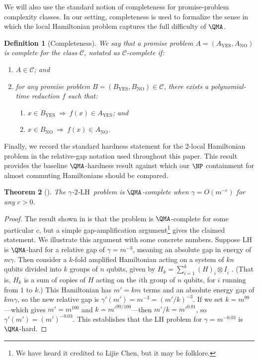 \documentclass[a4paper,onecolumn,11pt]{quantumarticle}
\theoremstyle{plain}
\newtheorem{theorem}{Theorem}[section]
\newtheorem{definition}[theorem]{Definition}
\newcommand{\kLH}{$\gamma$-$2$-$\mathrm{LH}$}
\begin{document}
We will also use the standard notion of completeness for promise-problem complexity classes.  In our setting, completeness is used to formalize the sense in which the local Hamiltonian problem captures the full difficulty of $\QMA$.

\begin{definition}[Completeness]
    We say that a promise problem $A = \left(A_{\mathrm{YES}}, A_{\mathrm{NO}}\right)$ is complete for the class $\mathcal{C}$, notated as $\mathcal{C}$-complete if:
    \begin{enumerate}
        \item $A \in \mathcal{C}$; and
        \item for any promise problem $B = \left(B_{\mathrm{YES}}, B_{\mathrm{NO}}\right) \in \mathcal{C}$, there exists a polynomial-time reduction $f$ such that:
        \begin{enumerate}
            \item $x \in B_{\mathrm{YES}} \: \Longrightarrow \: f(x) \in A_{\mathrm{YES}}$; and
            \item $x \in B_{\mathrm{NO}} \: \Longrightarrow \: f(x) \in A_{\mathrm{NO}}$.
        \end{enumerate}
    \end{enumerate}
\end{definition}

Finally, we record the standard hardness statement for the $2$-local Hamiltonian problem in the relative-gap notation used throughout this paper.  This result provides the baseline $\QMA$-hardness result against which our $\NP$ containment for almost commuting Hamiltonians should be compared.

\begin{theorem}[\cite{kkr}]
    The \kLH\ problem is $\QMA$-complete when $\gamma = O(m^{-c})$ for any $c > 0$.
\end{theorem}
\begin{proof} The result shown in \cite{kkr} is that the problem is $\QMA$-complete for some particular $c$, but a simple gap-amplification argument\footnote{We have heard it credited to Lijie Chen, but it may be folklore.} gives the claimed statement. We illustrate this argument with some concrete numbers. Suppose LH is $\QMA$-hard for a relative gap of $\gamma = m^{-3} $, meaning an absolute gap in energy of $m \gamma$. Then consider a $k$-fold amplified Hamiltonian acting on a system of $kn$ qubits divided into $k$ groups of $n$ qubits, given by $H_k = \sum_{i=1}^{k} (H)_i \otimes I_{\bar{i}}$ . (That is, $H_k$ is a sum of copies of $H$ acting on the $i$th group of $n$ qubits, for $i$ running from $1$ to $k$.) This Hamiltonian has $m' = km$ terms and an absolute energy gap of $km\gamma$, so the new relative gap is $\gamma'(m') = m^{-3} = (m'/k)^{-3}$. If we set $k = m^{99}$---which gives $m' = m^{100}$ and $k = m'^{99/100}$---then $m'/k = m'^{0.01}$, so $\gamma'(m') =(m')^{-0.03}$. This establishes that the LH problem for $\gamma = m^{-0.03}$ is $\QMA$-hard.
\end{proof}
\end{document}
